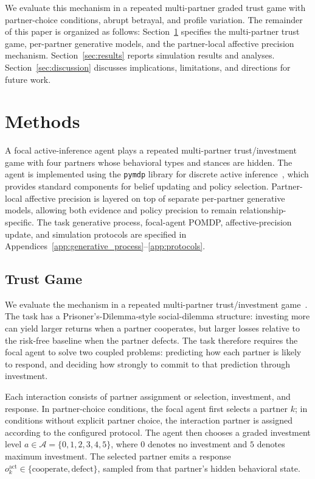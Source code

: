 \documentclass[runningheads,orivec]{llncs}
\begin{document}
We evaluate this mechanism in a repeated multi-partner graded trust game with partner-choice conditions, abrupt betrayal, and profile variation. The remainder of this paper is organized as follows: Section~\ref{sec:methods} specifies the multi-partner trust game, per-partner generative models, and the partner-local affective precision mechanism. Section~\ref{sec:results} reports simulation results and analyses. Section~\ref{sec:discussion} discusses implications, limitations, and directions for future work.
\section{Methods}
\label{sec:methods}

A focal active-inference agent plays a repeated multi-partner trust/investment game with four partners whose behavioral types and stances are hidden. The agent is implemented using the \texttt{pymdp} library for discrete active inference~\cite{DaCosta2020DiscreteSynthesis,Heins2022Pymdp}, which provides standard components for belief updating and policy selection. Partner-local affective precision is layered on top of separate per-partner generative models, allowing both evidence and policy precision to remain relationship-specific. The task generative process, focal-agent POMDP, affective-precision update, and simulation protocols are specified in Appendices~\ref{app:generative_process}--\ref{app:protocols}.

\subsection{Trust Game}
\label{sec:trust_game}

We evaluate the mechanism in a repeated multi-partner trust/investment game~\cite{Berg1995Trust}. The task has a Prisoner's-Dilemma-style social-dilemma structure: investing more can yield larger returns when a partner cooperates, but larger losses relative to the risk-free baseline when the partner defects. The task therefore requires the focal agent to solve two coupled problems: predicting how each partner is likely to respond, and deciding how strongly to commit to that prediction through investment.

Each interaction consists of partner assignment or selection, investment, and response. In partner-choice conditions, the focal agent first selects a partner \(k\); in conditions without explicit partner choice, the interaction partner is assigned according to the configured protocol. The agent then chooses a graded investment level \(a \in \mathcal{A}=\{0,1,2,3,4,5\}\), where \(0\) denotes no investment and \(5\) denotes maximum investment. The selected partner emits a response \(o_k^{\mathrm{act}} \in \{\mathrm{cooperate},\mathrm{defect}\}\), sampled from that partner's hidden behavioral state.
\end{document}
